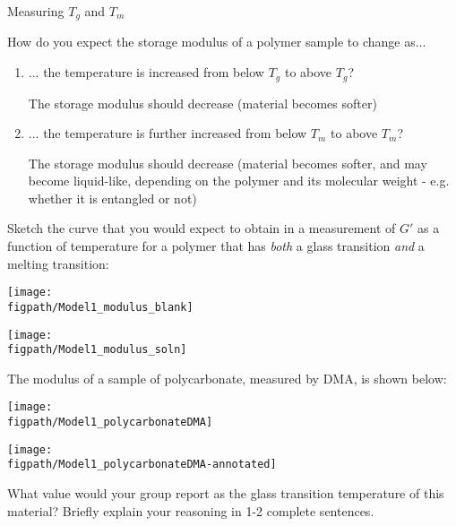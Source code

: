 \begin{activity}{Measuring $T_g$ and $T_m$}
\begin{model}
\end{model}


\begin{ctqs}

	\question How do you expect the storage modulus of a polymer sample to change as...
	
		\begin{enumerate}
			\item ... the temperature is increased from below $T_g$ to above $T_g$?
			
				\begin{solution}[0.75in]{}
					The storage modulus should decrease (material becomes softer)
				\end{solution}
			
			\item ... the temperature is further increased from below $T_m$ to above $T_m$?
			
				\begin{solution}[0.75in]{}
					The storage modulus should decrease (material becomes softer, and may become liquid-like, depending on the polymer and its molecular weight - e.g. whether it is entangled or not)
				\end{solution}
		
		\end{enumerate}
		
	\question Sketch the curve that you would expect to obtain in a measurement of $G'$ as a function of temperature for a polymer that has \emph{both} a glass transition \emph{and} a melting transition:
	
		\vspace{6pt}
		\begin{solution}[2.5in]{
			\centerline{\texttt{[image: \\figpath/Model1\_modulus\_blank]}}
		}
			\centerline{\texttt{[image: \\figpath/Model1\_modulus\_soln]}}
		\end{solution}
		
	
	\clearpage
	\question The modulus of a sample of polycarbonate, measured by DMA, is shown below:
	
		\vspace{6pt}
		\begin{solution}[2.5in]{
			\centerline{\texttt{[image: \\figpath/Model1\_polycarbonateDMA]}}
		}
			\centerline{\texttt{[image: \\figpath/Model1\_polycarbonateDMA-annotated]}}
		\end{solution}
		
		What value would your group report as the glass transition temperature of this material?  Briefly explain your reasoning in 1-2 complete sentences.
		

\end{ctqs}
\end{activity}

